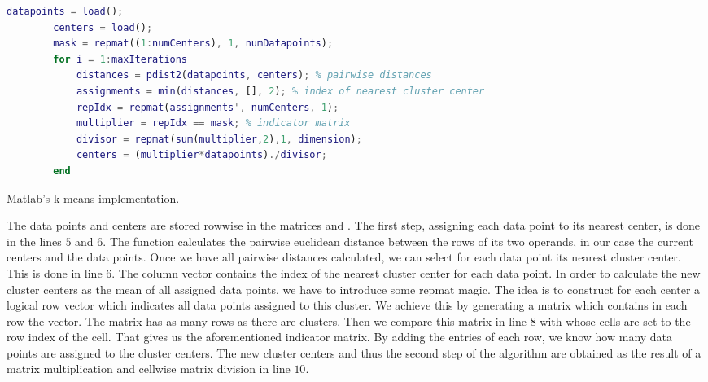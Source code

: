 \begin{listing}[!h]
	\begin{CenteredBox}
		\begin{lstlisting}[language=Matlab]
		datapoints = load();
		centers = load();
		mask = repmat((1:numCenters), 1, numDatapoints);
		for i = 1:maxIterations
  			distances = pdist2(datapoints, centers); % pairwise distances
  			assignments = min(distances, [], 2); % index of nearest cluster center
  			repIdx = repmat(assignments', numCenters, 1);
  			multiplier = repIdx == mask; % indicator matrix
  			divisor = repmat(sum(multiplier,2),1, dimension);
  			centers = (multiplier*datapoints)./divisor;
		end
		\end{lstlisting}
	\end{CenteredBox}
	\caption{Matlab's k-means implementation.}
	\label{lst:kmeansMatlab}
\end{listing}

The data points and centers are stored rowwise in the matrices  and .
The first step, assigning each data point to its nearest center, is done in the lines $5$ and $6$.
The  function calculates the pairwise euclidean distance between the rows of its two operands, in our case the current centers and the data points.
Once we have all pairwise distances calculated, we can select for each data point its nearest cluster center.
This is done in line $6$.
The  column vector contains the index of the nearest cluster center for each data point.
In order to calculate the new cluster centers as the mean of all assigned data points, we have to introduce some repmat magic.
The idea is to construct for each center a logical row vector which indicates all data points assigned to this cluster.
We achieve this by generating a matrix which contains in each row the  vector.
The matrix has as many rows as there are clusters.
Then we compare this matrix in line $8$ with  whose cells are set to the row index of the cell.
That gives us the aforementioned indicator matrix.
By adding the entries of each row, we know how many data points are assigned to the cluster centers.
The new cluster centers and thus the second step of the algorithm are obtained as the result of a matrix multiplication and cellwise matrix division in line $10$.	

